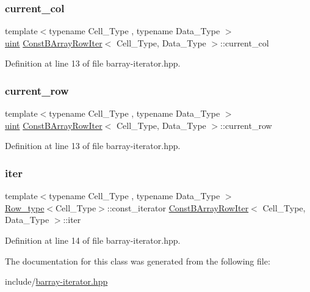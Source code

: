 \subsubsection{\texorpdfstring{current\+\_\+col}{current\_col}}
{\footnotesize\ttfamily template$<$typename Cell\+\_\+\+Type , typename Data\+\_\+\+Type $>$ \\
\hyperlink{typedefs_8hpp_a91ad9478d81a7aaf2593e8d9c3d06a14}{uint} \hyperlink{class_const_b_array_row_iter}{Const\+B\+Array\+Row\+Iter}$<$ Cell\+\_\+\+Type, Data\+\_\+\+Type $>$\+::current\+\_\+col}



Definition at line 13 of file barray-\/iterator.\+hpp.

\mbox{\label{class_const_b_array_row_iter_a6e12a5d0e899823179dd469d11f57b1a}} 
\subsubsection{\texorpdfstring{current\+\_\+row}{current\_row}}
{\footnotesize\ttfamily template$<$typename Cell\+\_\+\+Type , typename Data\+\_\+\+Type $>$ \\
\hyperlink{typedefs_8hpp_a91ad9478d81a7aaf2593e8d9c3d06a14}{uint} \hyperlink{class_const_b_array_row_iter}{Const\+B\+Array\+Row\+Iter}$<$ Cell\+\_\+\+Type, Data\+\_\+\+Type $>$\+::current\+\_\+row}



Definition at line 13 of file barray-\/iterator.\+hpp.

\mbox{\label{class_const_b_array_row_iter_ac01a8c0291ccc243bd4363bcbc5122a8}} 
\subsubsection{\texorpdfstring{iter}{iter}}
{\footnotesize\ttfamily template$<$typename Cell\+\_\+\+Type , typename Data\+\_\+\+Type $>$ \\
\hyperlink{typedefs_8hpp_a83d6ee40a2ba22844108bb8b82e9b951}{Row\+\_\+type}$<$Cell\+\_\+\+Type$>$\+::const\+\_\+iterator \hyperlink{class_const_b_array_row_iter}{Const\+B\+Array\+Row\+Iter}$<$ Cell\+\_\+\+Type, Data\+\_\+\+Type $>$\+::iter}



Definition at line 14 of file barray-\/iterator.\+hpp.



The documentation for this class was generated from the following file\+:\begin{DoxyCompactItemize}
\item 
include/\hyperlink{barray-iterator_8hpp}{barray-\/iterator.\+hpp}\end{DoxyCompactItemize}
